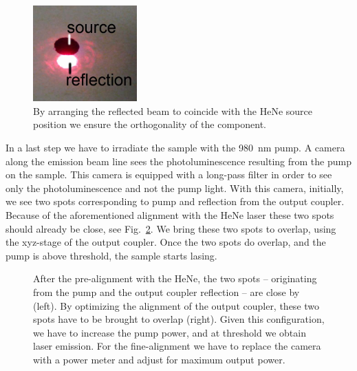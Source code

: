 \begin{figure}
\centering
\includegraphics[width=4cm]{img/HeNe.jpg}
\caption{By arranging the reflected beam to coincide with the HeNe source position
we ensure the orthogonality of the component.}
\label{img:HeNe}
\end{figure}

In a last step we have to irradiate the sample with the 980~nm pump.
A camera along the emission beam line
sees the photoluminescence resulting from the pump on the sample.
This camera is equipped with a long-pass filter
in order to see only the photoluminescence
and not the pump light.
With this camera,
initially,
we see two spots corresponding to
pump and reflection from the output coupler.
Because of the aforementioned alignment with the HeNe laser
these two spots should already be close,
see Fig.~\ref{img:spot_overlap}.
We bring these two spots to overlap,
using the xyz-stage of the output coupler.
Once the two spots do overlap,
and the pump is above threshold,
the sample starts lasing.

\begin{figure}
\centering
{}
\caption{After the pre-alignment
with the HeNe,
the two spots --
originating
from the pump
and the output coupler reflection --
are close by (left).
By optimizing the alignment
of the output coupler,
these two spots
have to be brought to overlap (right).
Given this configuration,
we have to increase the pump power,
and at threshold we obtain laser emission.
For the fine-alignment
we have to replace the camera
with a power meter
and adjust for maximum output power.}
\label{img:spot_overlap}
\end{figure}

